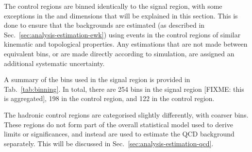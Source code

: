 The control regions are binned identically to the signal region, with some 
exceptions in the \mht and \nb dimensions that will be explained in this 
section. This is done to ensure that the backgrounds are 
estimated (as described in Sec.~\ref{sec:analysis-estimation-ewk}) using events 
in the control regions of similar kinematic and topological properties. Any 
estimations that are not made between equivalent bins, or are made directly 
according to simulation, are assigned an additional systematic uncertainty.

A summary of the bins used in the signal region is provided in 
Tab.~\ref{tab:binning}.
In total, there are 254 bins in the signal region [FIXME: this is aggregated], 
198 in the \mj control 
region, and 122 in the \mmj control region.

The hadronic control regions are categorised slightly differently, with coarser 
bins. These regions do not form part of the overall statistical model used to 
derive limits or significances, and instead are used to estimate the QCD 
background separately. This will be discussed in 
Sec.~\ref{sec:analysis-estimation-qcd}.

